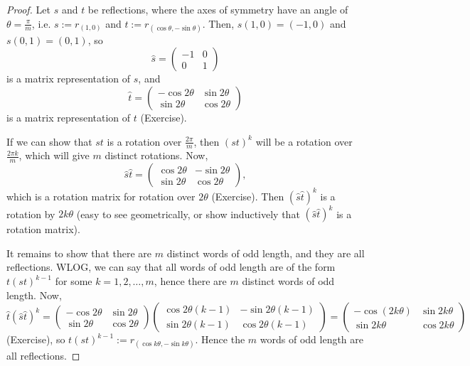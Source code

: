 \begin{proof}
Let $s$ and $t$ be reflections, where the axes of symmetry have an angle of
$\theta = \frac{\pi}{m}$, i.e. $s := r_{(1,0)}$ and
$t := r_{(\cos \theta,-\sin \theta)}$. %
Then, $s(1,0) = (-1,0)$ and $s(0,1) = (0,1)$, so
\[
    \hat{s} = \begin{pmatrix} -1 & 0 \\ 0 & 1 \end{pmatrix}
\]
is a matrix representation of $s$, and
\[
    \hat{t} = \begin{pmatrix} -\cos 2\theta & \sin 2\theta \\
        \sin 2\theta & \cos 2\theta \end{pmatrix}
\]
is a matrix representation of $t$ (Exercise).

If we can show that $st$ is a rotation over $\frac{2\pi}{m}$, then
$(st)^k$ will be a rotation over $\frac{2\pi k}{m}$, which will give $m$
distinct rotations. Now,
\[
    \hat{s} \hat{t} = \begin{pmatrix}
        \cos 2\theta & -\sin 2\theta \\
        \sin 2\theta & \cos 2\theta \end{pmatrix},
\]
which is a rotation matrix for rotation over $2\theta$ (Exercise).
Then $(\hat{s} \hat{t})^k$ is a rotation by $2k\theta$ (easy to see geometrically,
or show inductively that $(\hat{s}\hat{t})^k$ is a rotation matrix).

It remains to show that there are $m$ distinct words of odd length, and they
are all reflections. WLOG, we can say that all words of odd length are of the
form $t(st)^{k-1}$ for some $k=1,2,\dots,m$, hence there are $m$ distinct words
of odd length. Now,
\[
    \hat{t}(\hat{s}\hat{t})^k
    = \begin{pmatrix} -\cos 2\theta & \sin 2\theta \\
        \sin 2\theta & \cos 2\theta \end{pmatrix}
    \begin{pmatrix}
        \cos 2\theta(k-1) & -\sin 2\theta(k-1) \\
        \sin 2\theta(k-1) & \cos 2\theta(k-1) \end{pmatrix}
    = \begin{pmatrix}
        -\cos(2k\theta) & \sin 2k\theta \\
        \sin 2k\theta & \cos 2k\theta
    \end{pmatrix}
\]
(Exercise), so $t(st)^{k-1} := r_{(\cos k\theta, -\sin k\theta)}$. Hence the
$m$ words of odd length are all reflections.
\end{proof}

